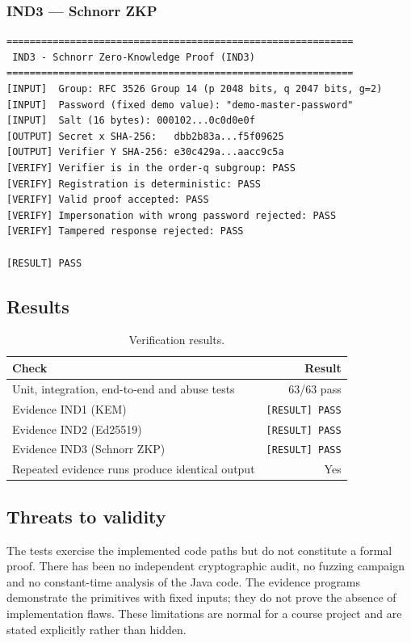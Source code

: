 \documentclass[11pt,a4paper]{article}
\newcommand{\code}[1]{\texttt{#1}}
\begin{document}
\subsubsection{IND3 --- Schnorr ZKP}

\begin{lstlisting}[style=plaincode,caption={IND3 output (abridged).},label={lst:ind3}]
============================================================
 IND3 - Schnorr Zero-Knowledge Proof (IND3)
============================================================
[INPUT]  Group: RFC 3526 Group 14 (p 2048 bits, q 2047 bits, g=2)
[INPUT]  Password (fixed demo value): "demo-master-password"
[INPUT]  Salt (16 bytes): 000102...0c0d0e0f
[OUTPUT] Secret x SHA-256:   dbb2b83a...f5f09625
[OUTPUT] Verifier Y SHA-256: e30c429a...aacc9c5a
[VERIFY] Verifier is in the order-q subgroup: PASS
[VERIFY] Registration is deterministic: PASS
[VERIFY] Valid proof accepted: PASS
[VERIFY] Impersonation with wrong password rejected: PASS
[VERIFY] Tampered response rejected: PASS

[RESULT] PASS
\end{lstlisting}

\subsection{Results}

\begin{table}[htbp]
\centering
\small
\begin{tabular}{@{}lr@{}}
\toprule
\textbf{Check} & \textbf{Result} \\
\midrule
Unit, integration, end-to-end and abuse tests & 63/63 pass \\
Evidence IND1 (KEM) & \code{[RESULT] PASS} \\
Evidence IND2 (Ed25519) & \code{[RESULT] PASS} \\
Evidence IND3 (Schnorr ZKP) & \code{[RESULT] PASS} \\
Repeated evidence runs produce identical output & Yes \\
\bottomrule
\end{tabular}
\caption{Verification results.}
\label{tab:results}
\end{table}

\subsection{Threats to validity}

The tests exercise the implemented code paths but do not constitute a formal
proof. There has been no independent cryptographic audit, no fuzzing campaign and
no constant-time analysis of the Java code. The evidence programs demonstrate
the primitives with fixed inputs; they do not prove the absence of
implementation flaws. These limitations are normal for a course project and are
stated explicitly rather than hidden.
\end{document}
